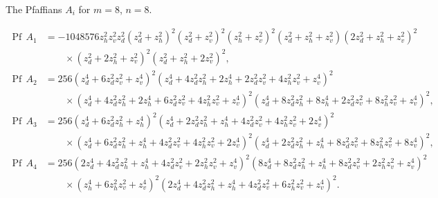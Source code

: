 \documentclass[12pt,reqno]{amsart}
\numberwithin{equation}{section}
\newcommand{\Pf}{{\operatorname{Pf}\,}}
\begin{document}
\begin{appendix}
The Pfaffians $A_i$ for $m=8$, $n=8$.
 
\[
\begin{aligned}
\Pf A_1&=-1048576  z_h^2z_v^2z_d^2 (z_d^2 + z_h^2)^2  (z_d^2 + z_v^2)^2 (z_h^2 + z_v^2)^2 (z_d^2 + z_h^2 + z_v^2) (2 z_d^2 + z_h^2 + z_v^2)^2 \\ &\qquad \times(z_d^2 + 2 z_h^2 + z_v^2)^2 (z_d^2 +z_h^2 + 2z_v^2)^2,\\
\Pf A_2&=256(z_d^4 +6z_d^2z_v^2 + z_v^4)^2(z_d^4 + 4z_d^2z_h^2 + 2z_h^4 + 2z_d^2z_v^2 + 4z_h^2z_v^2 +z_v^4)^2\\ &\qquad \times(z_d^4 + 4z_d^2z_h^2 + 2z_h^4 + 6z_d^2z_v^2 + 4z_h^2z_v^2 + z_v^4)^2(z_d^4 + 8z_d^2z_h^2 + 8z_h^4 + 2z_d^2z_v^2 + 8z_h^2z_v^2 +z_v^4)^2,\\
\Pf A_3&=256(z_d^4 + 6z_d^2z_h^2 + z_h^4)^2(z_d^4 + 2z_d^2z_h^2 + z_h^4 + 4z_d^2z_v^2 + 4z_h^2 z_v^2 + 2z_v^4)^2\\ &\qquad \times(z_d^4 + 6z_d^2z_h^2 + z_h^4 + 4z_d^2z_v^2 + 4z_h^2z_v^2 + 2z_v^4)^2 (z_d^4 + 2z_d^2z_h^2 + z_h^4 + 8z_d^2z_v^2 + 8z_h^2z_v^2 + 8z_v^4)^2,\\
\Pf A_4&=256 (2 z_d^4 + 4 z_d^2 z_h^2 + z_h^4 + 4 z_d^2 z_v^2 + 2 z_h^2 z_v^2 + z_v^4)^2 (8 z_d^4 + 8 z_d^2 z_h^2 + z_h^4 + 8 z_d^2 z_v^2 + 2 z_h^2 z_v^2 +z_v^4)^2 \\
&\qquad \times(z_h^4 + 6 z_h^2 z_v^2 + z_v^4)^2 (2 z_d^4 + 4 z_d^2 z_h^2 + z_h^4 +4 z_d^2 z_v^2 + 6 z_h^2 z_v^2 + z_v^4)^2.
\end{aligned}
\]

\end{appendix}
\end{document}
